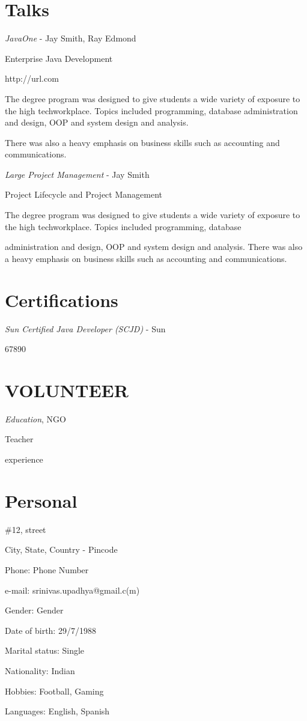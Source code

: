 \documentclass[11pt]{article}
\begin{document}
\section*{Talks}
%
\begin{leftrulebox}[1/2012]
	\textit{JavaOne} - Jay Smith, Ray Edmond \par
	Enterprise Java Development \par
	http://url.com \par
	The degree program was designed to give students a wide variety of exposure to the high techworkplace.
    Topics included programming, database administration and design, OOP and system design and analysis.
	
	There was also a heavy emphasis on business skills such as accounting and communications.
	
	\textit{Large Project Management} - Jay Smith \par
	Project Lifecycle and Project Management \par
	The degree program was designed to give students a wide variety of exposure to the high techworkplace.
    Topics included programming, database\par
	administration and design, OOP and system design and analysis. There was also a heavy emphasis on
    business skills such as accounting and communications.
\end{leftrulebox}
%
\section*{Certifications}
%
\begin{leftrulebox}[1/2012 -- 1/2013]
	\textit{Sun Certified Java Developer (SCJD)} - Sun \par
	67890
\end{leftrulebox}
%
\section*{VOLUNTEER}
%
\begin{leftrulebox}
	\textit{Education}, NGO \par
	Teacher \par
	experience
\end{leftrulebox}
%
\section*{Personal}
%
\begin{leftrulebox}[ADDRESS]
	\#12, street \par
	City, State, Country - Pincode \par
	Phone: Phone Number \par
	e-mail: srinivas.upadhya@gmail.c(m)\par
	Gender: Gender \par
	Date of birth: 29/7/1988 \par
	Marital status: Single \par
	Nationality: Indian \par
	Hobbies: Football, Gaming \par
	Languages: English, Spanish
\end{leftrulebox}
%
\end{document}
